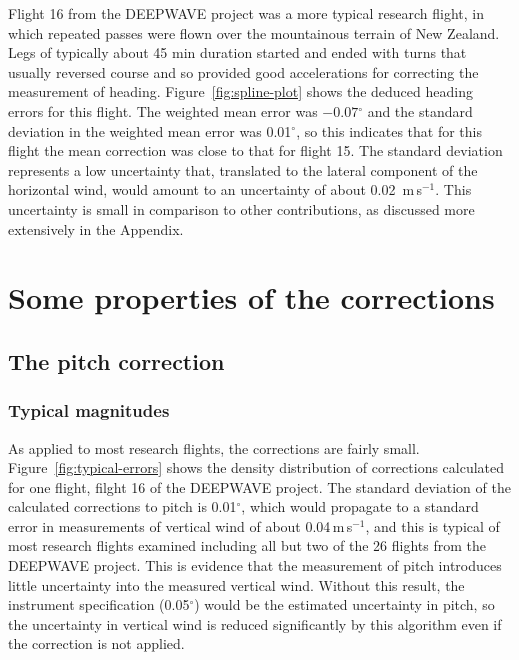 \documentclass[english,british,amtd,bookmarks=false,unicode=true]{copernicus}\usepackage[]{graphicx}\usepackage[]{color}
\begin{document}
Flight 16 from the DEEPWAVE project was a more typical research flight,
in which repeated passes were flown over the mountainous terrain of
New Zealand. Legs of typically about 45 min duration started and ended
with turns that usually reversed course and so provided good accelerations
for correcting the measurement of heading. Figure~\ref{fig:spline-plot}
shows the deduced heading errors for this flight. The weighted mean
error was \ensuremath{-0.07}$^{\circ}$ and the standard deviation
in the weighted mean error was 0.01$^{\circ}$,
so this indicates that for this flight the mean correction was close
to that for flight 15. The standard deviation represents a low uncertainty
that, translated to the lateral component of the horizontal wind,
would amount to an uncertainty of about 0.02~m\,s$^{-1}$.
This uncertainty is small in comparison to other contributions, as
discussed more extensively in the Appendix. 


\section{Some properties of the corrections}


\subsection{The pitch correction}


\subsubsection{Typical magnitudes}



As applied to most research flights, the corrections are fairly small.
Figure~\ref{fig:typical-errors} shows the density distribution of
corrections calculated for one flight, filght 16 of the DEEPWAVE project.
The standard deviation of the calculated corrections to pitch is 0.01$^{\circ}$,
which would propagate to a standard error in measurements of vertical
wind of about 0.04\,m\,s$^{-1}$,
and this is typical of most research flights examined including all
but two of the 26 flights from the DEEPWAVE project. This is evidence
that the measurement of pitch introduces little uncertainty into the
measured vertical wind. Without this result, the instrument specification
(0.05$^{\circ}$) would be the estimated uncertainty in pitch, so
the uncertainty in vertical wind is reduced significantly by this
algorithm even if the correction is not applied. 
\end{document}
